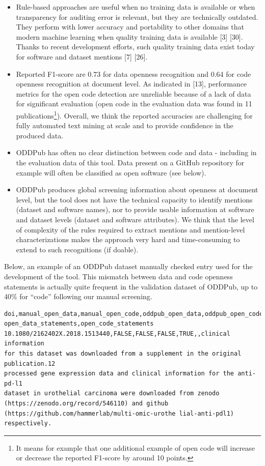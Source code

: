 \documentclass[
]{article}
\begin{document}
\begin{itemize}
\item
  Rule-based approaches are useful when no training data is available or
  when transparency for auditing error is relevant, but they are
  technically outdated. They perform with lower accuracy and portability
  to other domains that modern machine learning when quality training
  data is available {[}3{]} {[}30{]}. Thanks to recent development
  efforts, such quality training data exist today for software and
  dataset mentions {[}7{]} {[}26{]}.
\item
  Reported F1-score are 0.73 for data openness recognition and 0.64 for
  code openness recognition at document level. As indicated in {[}13{]},
  performance metrics for the open code detection are unreliable because
  of a lack of data for significant evaluation (open code in the
  evaluation data was found in 11 publications\footnote{It means for
    example that one additional example of open code will increase or
    decrease the reported F1-score by around 10 points.}). Overall, we
  think the reported accuracies are challenging for fully automated text
  mining at scale and to provide confidence in the produced data.
\item
  ODDPub has often no clear distinction between code and data -
  including in the evaluation data of this tool. Data present on a
  GitHub repository for example will often be classified as open
  software (see below).
\item
  ODDPub produces global screening information about openness at
  document level, but the tool does not have the technical capacity to
  identify mentions (dataset and software names), nor to provide usable
  information at software and dataset levels (dataset and software
  attributes). We think that the level of complexity of the rules
  required to extract mentions and mention-level characterizations makes
  the approach very hard and time-consuming to extend to such
  recognitions (if doable).
\end{itemize}

Below, an example of an ODDPub dataset manually checked entry used for
the development of the tool. This mismatch between data and code
openness statements is actually quite frequent in the validation dataset
of ODDPub, up to 40\% for ``code'' following our manual screening.

\begin{verbatim}
doi,manual_open_data,manual_open_code,oddpub_open_data,oddpub_open_code,
open_data_statements,open_code_statements
10.1080/2162402X.2018.1513440,FALSE,FALSE,FALSE,TRUE,,clinical information 
for this dataset was downloaded from a supplement in the original publication.12 
processed gene expression data and clinical information for the anti-pd-l1 
dataset in urothelial carcinoma were downloaded from zenodo 
(https://zenodo.org/record/546110) and github 
(https://github.com/hammerlab/multi-omic-urothe lial-anti-pdl1) respectively.
\end{verbatim}
\end{document}
